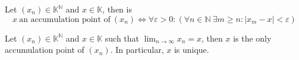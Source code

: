 

\begin{theorem}
   Let \((x_n) \in \mathbb{K}^\mathbb{N}\) and \(x \in \mathbb{K}\), then is
   \[x~\text{an accumulation point of}~(x_n) \iff \forall \varepsilon > 0: (\forall n \in \mathbb{N}~\exists m \geq n: |x_m - x| < \varepsilon)\]
\end{theorem}

\begin{theorem}
   Let \((x_n) \in \mathbb{K}^\mathbb{N}\) and \(x \in \mathbb{K}\) such that \(\lim_{n \to \infty} x_n = x\), then \(x\) is the only accumulation point of \((x_n)\).
   In particular, \(x\) is unique.
\end{theorem}

